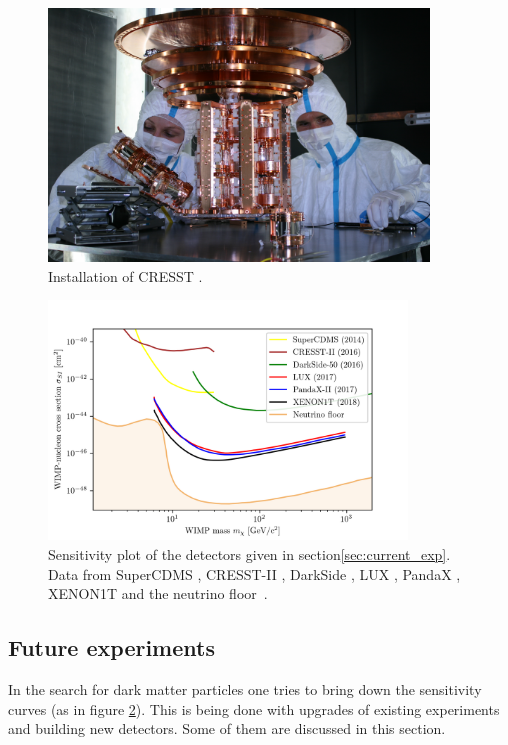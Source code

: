 \documentclass{article}
\begin{document}
\begin{figure}
    \centering
    \includegraphics[width=0.9\textwidth]{CRESST.jpg}
    \caption{Installation of CRESST \cite{CRESSTphoto}.}
    \label{fig:CRESST}
\end{figure}

\begin{figure}[h]
    \centering
    \includegraphics[width=0.85\textwidth]{Sens_plot_floor.png}
    \caption{Sensitivity plot of the detectors given in section\ref{sec:current_exp}. Data from SuperCDMS \cite{Agnese:2014aze}, CRESST-II \cite{Angloher:2015ewa}, DarkSide \cite{Agnes:2015ftt}, LUX \cite{Akerib:2016vxi}, PandaX \cite{Cui:2017nnn}, XENON1T \cite{Aprile:2018dbl} and the neutrino floor~\cite{Liu:2017drf}.}
    \label{fig:Sens}
\end{figure}


\subsection{Future experiments}
In the search for dark matter particles one tries to bring down the sensitivity curves (as in figure \ref{fig:Sens}). This is being done with upgrades of existing experiments and building new detectors. Some of them are discussed in this section.
\end{document}
